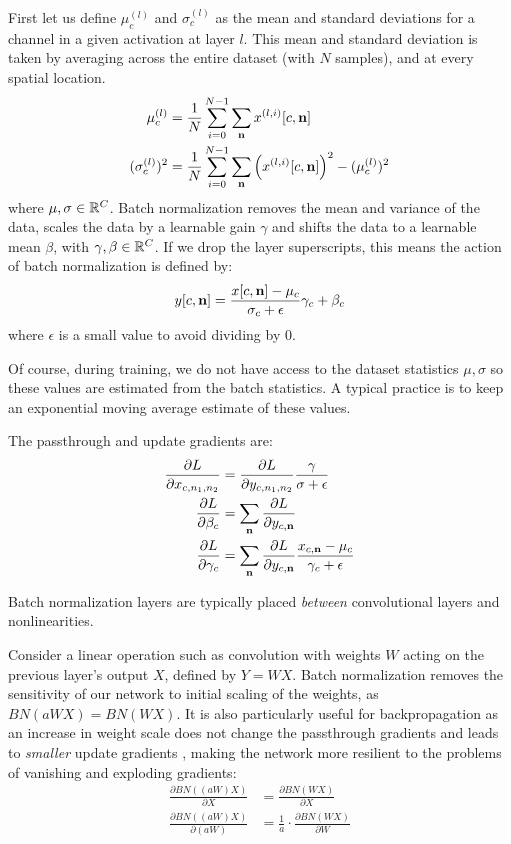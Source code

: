 First let us define $\mu_c^{(l)}$ and $\sigma_c^{(l)}$ as the mean and standard deviations
for a channel in a given activation at layer $l$. This mean and standard deviation is taken by
averaging across the entire dataset (with $N$ samples), and at every spatial location.
\begin{align}
  \mu_c^{(l)} &= \frac{1}{N}\sum_{i=0}^{N-1} \sum_\nn x^{(l, i)}[c, \nn] \\
  (\sigma_c^{(l)})^2 &=  \frac{1}{N} \sum_{i=0}^{N-1} \sum_\nn \left(x^{(l, i)}[c, \nn]\right)^2 - (\mu^{(l)}_c)^2
\end{align}
where $\mu, \sigma \in \reals[C]$.
Batch normalization removes the mean and variance of the data, scales the data
by a learnable gain $\gamma$ and shifts the data to a learnable mean $\beta$,
with $\gamma, \beta \in \reals[C]$. If we drop the layer superscripts, this
means the action of batch normalization is defined by:
\begin{equation}
  y[c, \nn] = \frac{x[c, \nn] - \mu_c}{\sigma_c + \epsilon}\gamma_c + \beta_c
\end{equation}
where $\epsilon$ is a small value to avoid dividing by 0.

Of course, during training, we do not have access to the dataset statistics $\mu, \sigma$
so these values are estimated from the batch statistics. A typical practice
is to keep an exponential moving average estimate of these values.

The passthrough and update gradients are:
\begin{align}
  \dydx{L}{x_{c, n_1, n_2}} &= \dydx{L}{y_{c, n_1, n_2}}\frac{\gamma}{\sigma + \epsilon}\\
  \dydx{L}{\beta_c} &=  \sum_\nn \dydx{L}{y_{c, \nn}}\\
  \dydx{L}{\gamma_c} &= \sum_\nn \dydx{L}{y_{c, \nn}}\frac{x_{c, \nn} - \mu_c}{\gamma_c + \epsilon}
\end{align}

Batch normalization layers are typically placed \emph{between} convolutional layers
and nonlinearities.

Consider a linear operation such as convolution with weights $W$ acting on the
previous layer's output $X$, defined by $Y = WX$.
Batch normalization
removes the sensitivity of our network to
initial scaling of the weights, as
$BN(aWX) = BN(WX)$.
It is also particularly useful for backpropagation as an increase in weight
scale does not change the passthrough gradients and leads to \emph{smaller}
update gradients \cite{ioffe_batch_2015}, making the network more resilient to
the problems of vanishing and exploding gradients:
\begin{align}
  \frac{\partial BN((aW)X)}{\partial X} & =  \frac{\partial
  BN(WX)}{\partial X} \nonumber\\
  \frac{\partial BN((aW)X)}{\partial (aW)} & =  \frac{1}{a} \cdot \frac{\partial
  BN(WX)}{\partial W}
\end{align}

